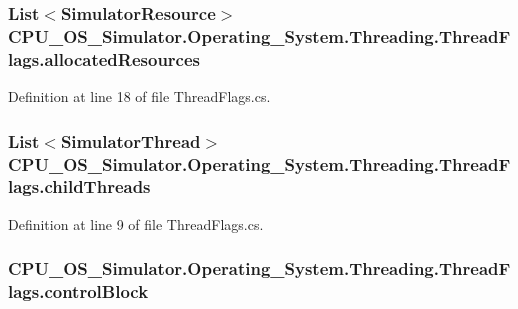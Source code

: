 \subsubsection[{allocated\+Resources}]{\setlength{\rightskip}{0pt plus 5cm}List$<${\bf Simulator\+Resource}$>$ C\+P\+U\+\_\+\+O\+S\+\_\+\+Simulator.\+Operating\+\_\+\+System.\+Threading.\+Thread\+Flags.\+allocated\+Resources}\label{struct_c_p_u___o_s___simulator_1_1_operating___system_1_1_threading_1_1_thread_flags_abe528720dcf27f540d51dd97231ca989}


Definition at line 18 of file Thread\+Flags.\+cs.

\hypertarget{struct_c_p_u___o_s___simulator_1_1_operating___system_1_1_threading_1_1_thread_flags_ac16ee9d27f576e74b32f7d6adc428791}{}
\subsubsection[{child\+Threads}]{\setlength{\rightskip}{0pt plus 5cm}List$<${\bf Simulator\+Thread}$>$ C\+P\+U\+\_\+\+O\+S\+\_\+\+Simulator.\+Operating\+\_\+\+System.\+Threading.\+Thread\+Flags.\+child\+Threads}\label{struct_c_p_u___o_s___simulator_1_1_operating___system_1_1_threading_1_1_thread_flags_ac16ee9d27f576e74b32f7d6adc428791}


Definition at line 9 of file Thread\+Flags.\+cs.

\hypertarget{struct_c_p_u___o_s___simulator_1_1_operating___system_1_1_threading_1_1_thread_flags_a64038f3c7b2598bb4365002668132fb9}{}
\subsubsection[{control\+Block}]{ C\+P\+U\+\_\+\+O\+S\+\_\+\+Simulator.\+Operating\+\_\+\+System.\+Threading.\+Thread\+Flags.\+control\+Block}\label{struct_c_p_u___o_s___simulator_1_1_operating___system_1_1_threading_1_1_thread_flags_a64038f3c7b2598bb4365002668132fb9}


